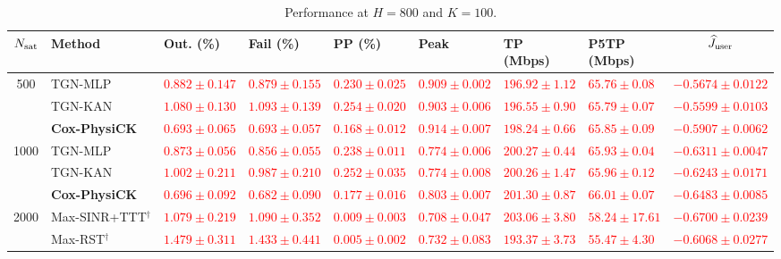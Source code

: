 \documentclass[10pt,letterpaper,journal]{IEEEtran}
\newcommand{\revnew}[1]{\textcolor{red}{#1}}
\begin{document}
\begin{table}[t]
\centering
\caption{Performance at $H=800$ and $K=100$.}
\label{tab:overall_nominal_summary}\label{tab:long_horizon_performance}
\fontsize{7.25}{8.7}\selectfont
\renewcommand{\arraystretch}{1.10}
\setlength{\tabcolsep}{2pt}
\begin{tabularx}{\textwidth}{@{}c >{\raggedright\arraybackslash}p{}*{6}{>{\centering\arraybackslash}X} c@{}}
\toprule
$N_{\rm sat}$ & Method & Out. (\%) & Fail (\%) & PP (\%) & Peak & \makecell{TP\\(Mbps)} & \makecell{P5TP\\(Mbps)} & $\widehat J_{\rm user}$ \\
\midrule
500 & TGN-MLP & \revnew{$0.882\pm0.147$} & \revnew{$0.879\pm0.155$} & \revnew{$0.230\pm0.025$} & \revnew{$0.909\pm0.002$} & \revnew{$196.92\pm1.12$} & \revnew{$65.76\pm0.08$} & \revnew{$-0.5674\pm0.0122$} \\
 & TGN-KAN & \revnew{$1.080\pm0.130$} & \revnew{$1.093\pm0.139$} & \revnew{$0.254\pm0.020$} & \revnew{$0.903\pm0.006$} & \revnew{$196.55\pm0.90$} & \revnew{$65.79\pm0.07$} & \revnew{$-0.5599\pm0.0103$} \\
 & \textbf{Cox-PhysiCK} & \revnew{$0.693\pm0.065$} & \revnew{$0.693\pm0.057$} & \revnew{$0.168\pm0.012$} & \revnew{$0.914\pm0.007$} & \revnew{$198.24\pm0.66$} & \revnew{$65.85\pm0.09$} & \revnew{$-0.5907\pm0.0062$} \\
\midrule
1000 & TGN-MLP & \revnew{$0.873\pm0.056$} & \revnew{$0.856\pm0.055$} & \revnew{$0.238\pm0.011$} & \revnew{$0.774\pm0.006$} & \revnew{$200.27\pm0.44$} & \revnew{$65.93\pm0.04$} & \revnew{$-0.6311\pm0.0047$} \\
 & TGN-KAN & \revnew{$1.002\pm0.211$} & \revnew{$0.987\pm0.210$} & \revnew{$0.252\pm0.035$} & \revnew{$0.774\pm0.008$} & \revnew{$200.26\pm1.47$} & \revnew{$65.96\pm0.12$} & \revnew{$-0.6243\pm0.0171$} \\
 & \textbf{Cox-PhysiCK} & \revnew{$0.696\pm0.092$} & \revnew{$0.682\pm0.090$} & \revnew{$0.177\pm0.016$} & \revnew{$0.803\pm0.007$} & \revnew{$201.30\pm0.87$} & \revnew{$66.01\pm0.07$} & \revnew{$-0.6483\pm0.0085$} \\
\midrule
2000 & Max-SINR+TTT$^\dagger$ & \revnew{$1.079\pm0.219$} & \revnew{$1.090\pm0.352$} & \revnew{$0.009\pm0.003$} & \revnew{$0.708\pm0.047$} & \revnew{$203.06\pm3.80$} & \revnew{$58.24\pm17.61$} & \revnew{$-0.6700\pm0.0239$} \\
 & Max-RST$^\dagger$ & \revnew{$1.479\pm0.311$} & \revnew{$1.433\pm0.441$} & \revnew{$0.005\pm0.002$} & \revnew{$0.732\pm0.083$} & \revnew{$193.37\pm3.73$} & \revnew{$55.47\pm4.30$} & \revnew{$-0.6068\pm0.0277$} \\

\end{tabularx}
\end{table}
\end{document}
